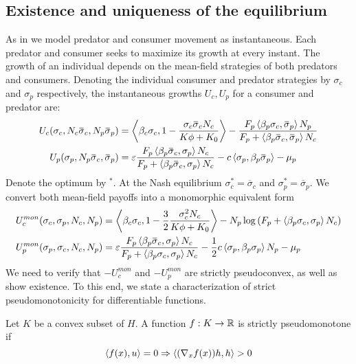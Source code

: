 \subsection{Existence and uniqueness of the equilibrium}
As in  we model predator and consumer movement as instantaneous. Each predator and consumer seeks to maximize its growth at every instant. The growth of an individual depends on the mean-field strategies of both predators and consumers. Denoting the individual consumer and predator strategies by $\sigma_c$ and $\sigma_p$ respectively, the instantaneous growths $U_c,U_p$ for a consumer and predator are:
\begin{align}
  U_c(\sigma_c, N_c \overbar{\sigma}_c, N_p\overbar{\sigma}_p) &= \ip{\beta_c \sigma_c}{1-\frac{\sigma_c \overbar{\sigma}_c N_c}{K\phi + K_0}} - \frac{F_p \ip{\beta_p \sigma_c}{\overbar{\sigma}_p} N_p}{F_p + \ip{\beta_p \overbar{\sigma}_c}{\overbar{\sigma}_p} N_c} \\
  U_p(\sigma_p, N_p \overbar{\sigma}_c, \overbar{\sigma}_p) &= \epsilon \frac{F_p \ip{\beta_p \overbar{\sigma}_c}{\sigma_p} N_c}{F_p + \ip{\beta_p \overbar{\sigma}_c}{\sigma_p} N_c} - c \ip{\sigma_p}{\beta_p \overbar{\sigma}_p}  - \mu_p
\end{align}
Denote the optimum by $^*$. At the Nash equilibrium $\sigma_c^*=\overbar{\sigma}_c$ and $\sigma_p^* = \overbar{\sigma}_p$. We convert both mean-field payoffs into a monomorphic equivalent form 
\begin{align}
  \label{eq:mon_eq_forms}
  U_c^{mon}(\sigma_c, \sigma_p, N_c, N_p) &= \ip{\beta_c \sigma_c}{1-\frac{3}{2}\frac{\sigma_c^2 N_c}{K\phi + K_0}} - N_p\log\pa{F_p + \ip{\beta_p \sigma_c}{\sigma_p} N_c} \\
  U_p^{mon}(\sigma_p, \sigma_c, N_c, N_p) &= \epsilon \frac{F_p \ip{\beta_p \overbar{\sigma}_c}{\sigma_p} N_c}{F_p + \ip{\beta_p \sigma_c}{\sigma_p} N_c} - \frac{1}{2}c \ip{\sigma_p}{\beta_p \sigma_p}N_p  - \mu_p
\end{align}
We need to verify that $-U_c^{mon}$ and $-U_p^{mon}$ are strictly pseudoconvex, as well as show existence. To this end, we state a characterization of strict pseudomonotonicity for differentiable functions.
\begin{lemma}
  \label{lem:strict_pm}
  Let $K$ be a convex subset of $H$. A function $f: K \to \mathbb{R}$ is strictly pseudomonotone if
  \begin{equation}
    \left \langle f(x),u \right \rangle = 0 \Rightarrow \left \langle (\nabla_x f(x))h,h \right \rangle > 0
  \end{equation}
\end{lemma}
